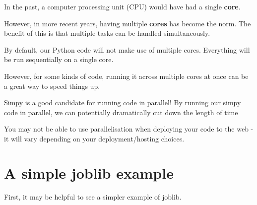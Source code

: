\documentclass[
  letterpaper,
  DIV=11,
  numbers=noendperiod]{scrreprt}
\begin{document}
\begin{tcolorbox}[enhanced jigsaw, colframe=quarto-callout-note-color-frame, bottomtitle=1mm, breakable, rightrule=.15mm, coltitle=black, colbacktitle=quarto-callout-note-color!10!white, opacityback=0, leftrule=.75mm, arc=.35mm, toptitle=1mm, title=\textcolor{quarto-callout-note-color}{\faInfo}\hspace{0.5em}{Note}, titlerule=0mm, colback=white, toprule=.15mm, bottomrule=.15mm, left=2mm, opacitybacktitle=0.6]

In the past, a computer processing unit (CPU) would have had a single
\textbf{core}.

However, in more recent years, having multiple \textbf{cores} has become
the norm. The benefit of this is that multiple tasks can be handled
simultaneously.

By default, our Python code will not make use of multiple cores.
Everything will be run sequentially on a single core.

However, for some kinds of code, running it across multiple cores at
once can be a great way to speed things up.

\end{tcolorbox}

Simpy is a good candidate for running code in parallel! By running our
simpy code in parallel, we can potentially dramatically cut down the
length of time

\begin{tcolorbox}[enhanced jigsaw, colframe=quarto-callout-warning-color-frame, bottomtitle=1mm, breakable, rightrule=.15mm, coltitle=black, colbacktitle=quarto-callout-warning-color!10!white, opacityback=0, leftrule=.75mm, arc=.35mm, toptitle=1mm, title=\textcolor{quarto-callout-warning-color}{\faExclamationTriangle}\hspace{0.5em}{Warning}, titlerule=0mm, colback=white, toprule=.15mm, bottomrule=.15mm, left=2mm, opacitybacktitle=0.6]

You may not be able to use parallelisation when deploying your code to
the web - it will vary depending on your deployment/hosting choices.

\end{tcolorbox}

\section{A simple joblib example}\label{a-simple-joblib-example}

First, it may be helpful to see a simpler example of joblib.
\end{document}
